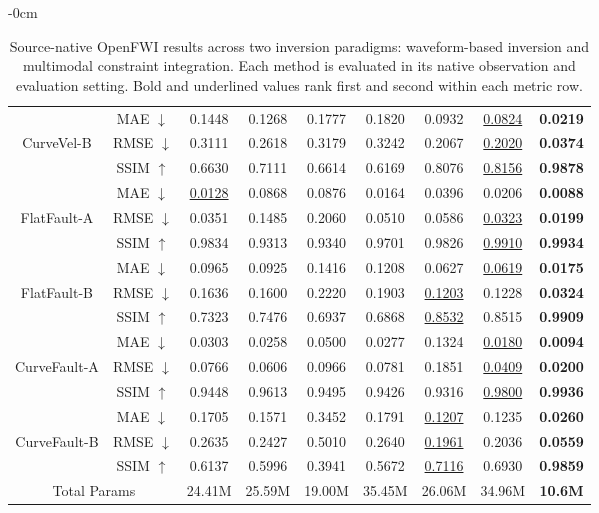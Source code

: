 \begin{table}[t]
\begin{adjustwidth}{-\extralength}{0cm}
\begin{tabular*}{\linewidth}{@{\extracolsep{\fill}}c c c c c c c c c@{}}
		\addlinespace[2pt]
		& MAE $\downarrow$ & 0.1448 & 0.1268 & 0.1777 & 0.1820 & 0.0932 & \underline{0.0824} & \textbf{0.0219} \\
		CurveVel-B & RMSE $\downarrow$ & 0.3111 & 0.2618 & 0.3179 & 0.3242 & 0.2067 & \underline{0.2020} & \textbf{0.0374} \\
		& SSIM $\uparrow$ & 0.6630 & 0.7111 & 0.6614 & 0.6169 & 0.8076 & \underline{0.8156} & \textbf{0.9878} \\
		\midrule
		& MAE $\downarrow$ & \underline{0.0128} & 0.0868 & 0.0876 & 0.0164 & 0.0396 & 0.0206 & \textbf{0.0088} \\
		FlatFault-A & RMSE $\downarrow$ & 0.0351 & 0.1485 & 0.2060 & 0.0510 & 0.0586 & \underline{0.0323} & \textbf{0.0199} \\
		& SSIM $\uparrow$ & 0.9834 & 0.9313 & 0.9340 & 0.9701 & 0.9826 & \underline{0.9910} & \textbf{0.9934} \\
		\addlinespace[2pt]
		& MAE $\downarrow$ & 0.0965 & 0.0925 & 0.1416 & 0.1208 & 0.0627 & \underline{0.0619} & \textbf{0.0175} \\
		FlatFault-B & RMSE $\downarrow$ & 0.1636 & 0.1600 & 0.2220 & 0.1903 & \underline{0.1203} & 0.1228 & \textbf{0.0324} \\
		& SSIM $\uparrow$ & 0.7323 & 0.7476 & 0.6937 & 0.6868 & \underline{0.8532} & 0.8515 & \textbf{0.9909} \\
		\midrule
		& MAE $\downarrow$ & 0.0303 & 0.0258 & 0.0500 & 0.0277 & 0.1324 & \underline{0.0180} & \textbf{0.0094} \\
		CurveFault-A & RMSE $\downarrow$ & 0.0766 & 0.0606 & 0.0966 & 0.0781 & 0.1851 & \underline{0.0409} & \textbf{0.0200} \\
		& SSIM $\uparrow$ & 0.9448 & 0.9613 & 0.9495 & 0.9426 & 0.9316 & \underline{0.9800} & \textbf{0.9936} \\
		\addlinespace[2pt]
		& MAE $\downarrow$ & 0.1705 & 0.1571 & 0.3452 & 0.1791 & \underline{0.1207} & 0.1235 & \textbf{0.0260} \\
		CurveFault-B & RMSE $\downarrow$ & 0.2635 & 0.2427 & 0.5010 & 0.2640 & \underline{0.1961} & 0.2036 & \textbf{0.0559} \\
		& SSIM $\uparrow$ & 0.6137 & 0.5996 & 0.3941 & 0.5672 & \underline{0.7116} & 0.6930 & \textbf{0.9859} \\
		\midrule
		\multicolumn{2}{c}{Total Params} & 24.41M & 25.59M & 19.00M & 35.45M & 26.06M & 34.96M & \textbf{10.6M} \\
		\bottomrule
	\end{tabular*}
	\caption{Source-native OpenFWI results across two inversion paradigms: waveform-based inversion and multimodal constraint integration. Each method is evaluated in its native observation and evaluation setting. Bold and underlined values rank first and second within each metric row.}
	\label{tab:main-comparison}

\end{adjustwidth}
\end{table}

